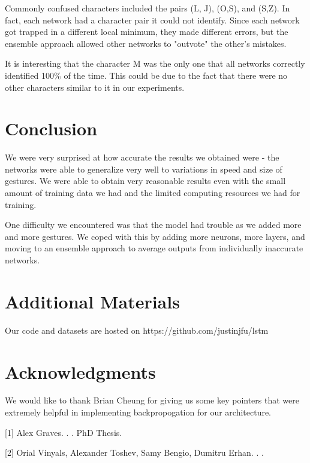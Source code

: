 \documentclass[11pt]{article}
\begin{document}
Commonly confused characters included the pairs (L, J), (O,S), 
and (S,Z). In fact, each network had a character pair it 
could not identify. Since each network got trapped in a
different local minimum, they made different errors, 
but the ensemble approach allowed other networks to
"outvote" the other's mistakes.

It is interesting that the character M was the only
one that all networks correctly identified 100\% of the time.
This could be due to the fact that there were no other
characters similar to it in our experiments.

\section{Conclusion}

We were very surprised at how accurate the results
we obtained were - 
the networks were able to generalize very well
to variations in speed and size of gestures. We
were able to obtain very reasonable results
even with the small amount of training data we had
and the limited computing resources we had for
training.

One difficulty we encountered was that the model
had trouble as we added more and more gestures.
We coped with this by adding more neurons, more layers,
and moving to an ensemble approach to average
outputs from individually inaccurate networks.

\section*{Additional Materials}

Our code and datasets are hosted on 
https://github.com/justinjfu/lstm

\section*{Acknowledgments}

We would like to thank Brian Cheung for giving us
some key pointers that were
extremely helpful in implementing backpropogation
for our architecture.

\begin{thebibliography}{}

[1]
Alex Graves.
.
.
\newblock PhD Thesis.

[2]
Orial Vinyals, Alexander Toshev, Samy Bengio, Dumitru Erhan.
.
.

\end{thebibliography}
\end{document}
